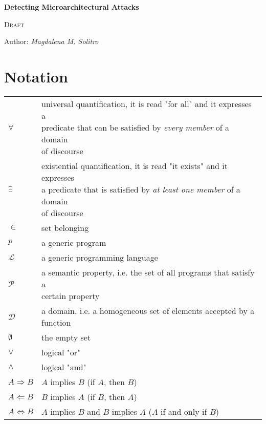 \documentclass[12pt,a4paper]{book}
\theoremstyle{definition}
\begin{document}
	
	\begin{titlepage}
		\begin{center}
			\vspace*{1cm}
			
			\Huge
			\textbf{\Huge Detecting Microarchitectural Attacks}
			
			\vspace{0.3cm}
			\LARGE \textsc{Draft}
			
			\vspace{1.5cm}
			
			\large Author: \textit{Magdalena M. Solitro}
			
			\vfill
		\end{center}
	\end{titlepage}
	
	\tableofcontents
	
	\mainmatter
	
	\chapter*{Notation}\label{chapter:notation}
	
	\renewcommand{\arraystretch}{2.0}
	\setlength{\tabcolsep}{25pt}
	\begin{tabular}{l l}
		$\forall$ & \makecell[l]{universal quantification, it is read "for all" and it expresses a \\predicate that can be satisfied by \textit{every member} of a domain\\ of discourse} \\
		$\exists$ & \makecell[l]{existential quantification, it is read "it exists" and it expresses \\a predicate that is satisfied by \textit{at least one member} of a domain\\ of discourse} \\
		$\in$ & set belonging \\
		$p$ & a generic program \\
		$\mathcal{L}$ & a generic programming language \\
		$\mathcal{P}$ & \makecell[l]{a semantic property, i.e. the set of all programs that satisfy a\\certain property} \\
		$\mathcal{D}$ & a domain, i.e. a homogeneous set of elements accepted by a function\\
		$\emptyset$ & the empty set \\
		$\vee$ & logical "or"\\
		$\wedge$ & logical "and"\\
		$A \Longrightarrow B$ & $A$ implies $B$ (if $A$, then $B$)\\
		$A \Longleftarrow B$ & $B$ implies $A$ (if $B$, then $A$)\\
		$A \Longleftrightarrow B$& $A$ implies $B$ and $B$ implies $A$ ($A$ if and only if $B$)\\
	\end{tabular}
	
\end{document}
